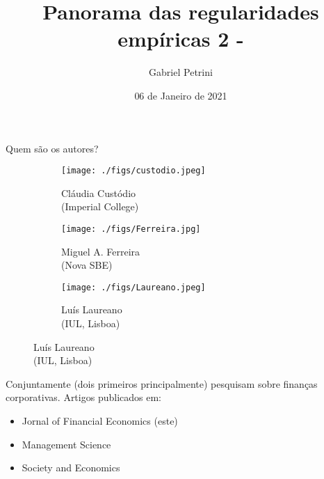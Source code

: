 \documentclass[presentation]{beamer}
\author{Gabriel Petrini}
\date{06 de Janeiro de 2021}
\title{Panorama das regularidades empíricas 2 - \textcite{custodio_2013_Why}}
\begin{document}
\maketitle
\section{}
\label{sec:orgad194aa}

\begin{frame}[label={sec:orgd54013d}]{Quem são os autores?}
\begin{figure}
\caption{Autores}
\begin{subfigure}{.3\linewidth}
\centering
\texttt{[image: ./figs/custodio.jpeg]}
\caption{Cláudia Custódio\\(Imperial College)}
\end{subfigure}%
\begin{subfigure}{.3\linewidth}
\centering
\texttt{[image: ./figs/Ferreira.jpg]}
\caption{Miguel A. Ferreira\\(Nova SBE)}
\end{subfigure}%
\begin{subfigure}{.3\linewidth}
\centering
\texttt{[image: ./figs/Laureano.jpeg]}
\caption{Luís Laureano\\(IUL, Lisboa)}
\end{subfigure}
\end{figure}


Conjuntamente (dois primeiros principalmente) pesquisam sobre finanças corporativas.
Artigos publicados em:
\begin{itemize}
\item Jornal of Financial Economics (este)
\item Management Science
\item Society and Economics
\end{itemize}
\end{frame}
\end{document}
